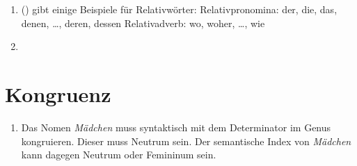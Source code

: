 \begin{enumerate}
\item () gibt einige Beispiele für Relativwörter:
\eal
\ex Relativpronomina: der, die, das, denen, \ldots, deren, dessen
\ex Relativadverb: wo, woher, \ldots, wie 
\zl


\item ~\\
\centerline{
}
\end{enumerate}


\section{Kongruenz}

\begin{enumerate}
\item Das Nomen \emph{Mädchen} muss syntaktisch mit dem Determinator im Genus kongruieren. Dieser
  muss Neutrum sein. Der semantische Index von \emph{Mädchen} kann dagegen Neutrum oder Femininum sein.
\end{enumerate}

